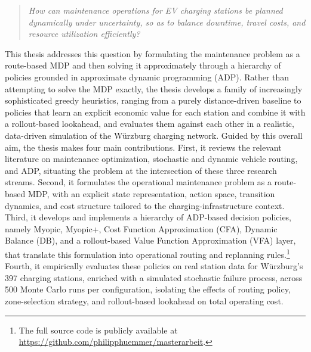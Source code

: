 \documentclass[12pt,oneside]{article}
\begin{document}
\begin{quote}
\emph{How can maintenance operations for EV charging stations be planned dynamically under uncertainty, so as to balance downtime, travel costs, and resource utilization efficiently?}
\end{quote}

This thesis addresses this question by formulating the maintenance problem as a route-based MDP and then solving it approximately through a hierarchy of policies grounded in approximate dynamic programming (ADP). Rather than attempting to solve the MDP exactly, the thesis develops a family of increasingly sophisticated greedy heuristics, ranging from a purely distance-driven baseline to policies that learn an explicit economic value for each station and combine it with a rollout-based lookahead, and evaluates them against each other in a realistic, data-driven simulation of the Würzburg charging network. Guided by this overall aim, the thesis makes four main contributions. First, it reviews the relevant literature on maintenance optimization, stochastic and dynamic vehicle routing, and ADP, situating the problem at the intersection of these three research streams. Second, it formulates the operational maintenance problem as a route-based MDP, with an explicit state representation, action space, transition dynamics, and cost structure tailored to the charging-infrastructure context. Third, it develops and implements a hierarchy of ADP-based decision policies, namely Myopic, Myopic+, Cost Function Approximation (CFA), Dynamic Balance (DB), and a rollout-based Value Function Approximation (VFA) layer, that translate this formulation into operational routing and replanning rules.\footnote{The full source code is publicly available at \url{https://github.com/philipphuemmer/masterarbeit}.} Fourth, it empirically evaluates these policies on real station data for Würzburg's 397 charging stations, enriched with a simulated stochastic failure process, across 500 Monte Carlo runs per configuration, isolating the effects of routing policy, zone-selection strategy, and rollout-based lookahead on total operating cost.
\end{document}
